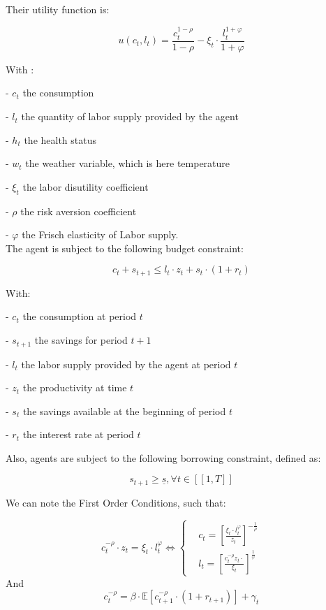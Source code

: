 \documentclass{article}
\begin{document}
Their utility function is: 

$$u(c_{t},l_{t}) = \frac{c_{t}^{1-\rho}}{1-\rho}-\xi_{t}\cdot \frac{l_{t}^{1+\varphi}}{1+\varphi}$$

With : 

-  $c_{t}$  the consumption

-  $l_{t}$  the quantity of labor supply provided by the agent

-  $h_{t}$  the health status

-  $w_{t}$  the weather variable, which is here temperature

-  $\xi_{t}$ the labor disutility coefficient

- $\rho$ the risk aversion coefficient

- $\varphi$ the Frisch elasticity of Labor supply.
\\

The agent is subject to the following budget constraint:

$$c_{t} + s_{t+1} \leq l_{t}\cdot z_{t} + s_{t}\cdot(1+r_{t})$$

With: 

-  $c_t$ the consumption at period $t$

-  $s_{t+1}$ the savings for period $t+1$

-  $l_t$ the labor supply provided by the agent at period $t$

-  $z_t$ the productivity at time $t$

-  $s_{t}$ the savings available at the beginning of period $t$

-  $r_{t}$ the interest rate at period $t$

Also, agents are subject to the following borrowing constraint, defined as: 

$$s_{t+1}\geq \underline{s}, \forall t \in [\![1,T]\!]$$


We can note the First Order Conditions, such that: 

\begin{equation}
    c^{-\rho}_{t}\cdot z_{t} = \xi_{t}\cdot l_{t}^{\varphi} \iff
        \begin{cases}
        & c_t = \left[\frac{\xi_{t}\cdot l_{t}^{\varphi}}{z_{t}}\right]^{-\frac{1}{\rho}}\\ 
        & l_{t} = \left[\frac{c_{t}^{-\rho}z_{t}\cdot}{\xi_{t}}\right]^{\frac{1}{\varphi}}
    \end{cases}
\end{equation}
And 
\begin{equation}
    c^{-\rho}_{t} = \beta \cdot \mathbb{E}\left[c^{-\rho}_{t+1}\cdot (1+r_{t+1})\right] + \gamma_{t}
\end{equation}
\end{document}
